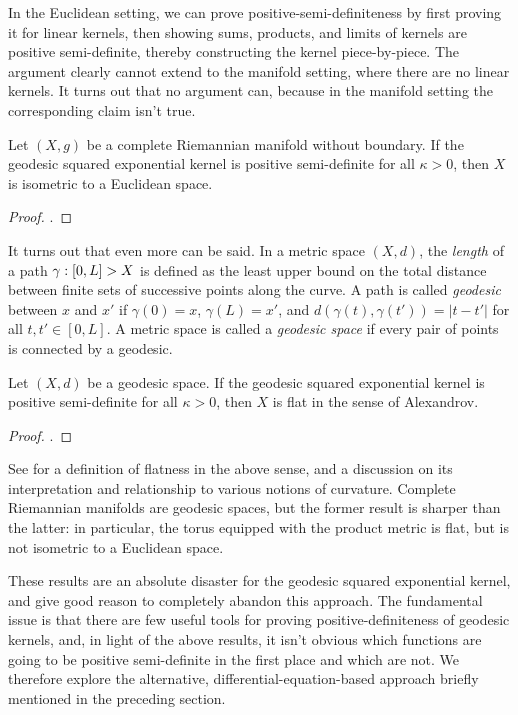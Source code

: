 \documentclass[11pt]{book}
\begin{document}
In the Euclidean setting, we can prove positive-semi-definiteness by first proving it for linear kernels, then showing sums, products, and limits of kernels are positive semi-definite, thereby constructing the kernel piece-by-piece.
The argument clearly cannot extend to the manifold setting, where there are no linear kernels.
It turns out that no argument can, because in the manifold setting the corresponding claim isn't true.

\begin{result}
Let $(X,g)$ be a complete Riemannian manifold without boundary.
If the geodesic squared exponential kernel is positive semi-definite for all $\kappa > 0$, then $X$ is isometric to a Euclidean space.
\end{result}

\begin{proof}
\textcite[Theorem 2]{feragen15}.
\end{proof}

It turns out that even more can be said.
In a metric space $(X,d)$, the \emph{length} of a path  $\gamma : [0,L] \-> X$ is defined as the least upper bound on the total distance between finite sets of successive points along the curve.
A path is called \emph{geodesic} between $x$ and $x'$ if $\gamma(0) = x$, $\gamma(L) = x'$, and $d(\gamma(t),\gamma(t')) = |t - t'|$ for all $t,t'\in[0,L]$.
A metric space is called a \emph{geodesic space} if every pair of points is connected by a geodesic.

\begin{result}
Let $(X,d)$ be a geodesic space.
If the geodesic squared exponential kernel is positive semi-definite for all $\kappa > 0$, then $X$ is flat in the sense of Alexandrov.
\end{result}

\begin{proof}
\textcite[Theorem 2]{feragen15}.
\end{proof}

See \textcite[Chapter 26]{villani08} for a definition of flatness in the above sense, and a discussion on its interpretation and relationship to various notions of curvature.
Complete Riemannian manifolds are geodesic spaces, but the former result is sharper than the latter: in particular, the torus equipped with the product metric is flat, but is not isometric to a Euclidean space.

These results are an absolute disaster for the geodesic squared exponential kernel, and give good reason to completely abandon this approach.
The fundamental issue is that there are few useful tools for proving positive-definiteness of geodesic kernels, and, in light of the above results, it isn't obvious which functions are going to be positive semi-definite in the first place and which are not.
We therefore explore the alternative, differential-equation-based approach briefly mentioned in the preceding section.
\end{document}
